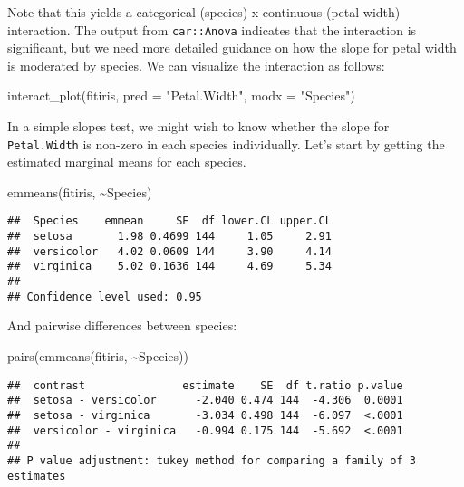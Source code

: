 \documentclass[
]{book}
\newenvironment{Shaded}{\begin{snugshade}}{\end{snugshade}}
\newcommand{\AttributeTok}[1]{\textcolor[rgb]{0.77,0.63,0.00}{#1}}
\newcommand{\FunctionTok}[1]{\textcolor[rgb]{0.00,0.00,0.00}{#1}}
\newcommand{\NormalTok}[1]{#1}
\newcommand{\SpecialCharTok}[1]{\textcolor[rgb]{0.00,0.00,0.00}{#1}}
\newcommand{\StringTok}[1]{\textcolor[rgb]{0.31,0.60,0.02}{#1}}
\begin{document}
Note that this yields a categorical (species) x continuous (petal width) interaction. The output from \texttt{car::Anova} indicates that the interaction is significant, but we need more detailed guidance on how the slope for petal width is moderated by species. We can visualize the interaction as follows:

\begin{Shaded}
\begin{Highlighting}[]
\FunctionTok{interact\_plot}\NormalTok{(fitiris, }\AttributeTok{pred =} \StringTok{"Petal.Width"}\NormalTok{, }\AttributeTok{modx =} \StringTok{"Species"}\NormalTok{)}
\end{Highlighting}
\end{Shaded}

In a simple slopes test, we might wish to know whether the slope for \texttt{Petal.Width} is non-zero in each species individually. Let's start by getting the estimated marginal means for each species.

\begin{Shaded}
\begin{Highlighting}[]
\FunctionTok{emmeans}\NormalTok{(fitiris, }\SpecialCharTok{\textasciitilde{}}\NormalTok{Species)}
\end{Highlighting}
\end{Shaded}

\begin{verbatim}
##  Species    emmean     SE  df lower.CL upper.CL
##  setosa       1.98 0.4699 144     1.05     2.91
##  versicolor   4.02 0.0609 144     3.90     4.14
##  virginica    5.02 0.1636 144     4.69     5.34
## 
## Confidence level used: 0.95
\end{verbatim}

And pairwise differences between species:

\begin{Shaded}
\begin{Highlighting}[]
\FunctionTok{pairs}\NormalTok{(}\FunctionTok{emmeans}\NormalTok{(fitiris, }\SpecialCharTok{\textasciitilde{}}\NormalTok{Species))}
\end{Highlighting}
\end{Shaded}

\begin{verbatim}
##  contrast               estimate    SE  df t.ratio p.value
##  setosa - versicolor      -2.040 0.474 144  -4.306  0.0001
##  setosa - virginica       -3.034 0.498 144  -6.097  <.0001
##  versicolor - virginica   -0.994 0.175 144  -5.692  <.0001
## 
## P value adjustment: tukey method for comparing a family of 3 estimates
\end{verbatim}
\end{document}
